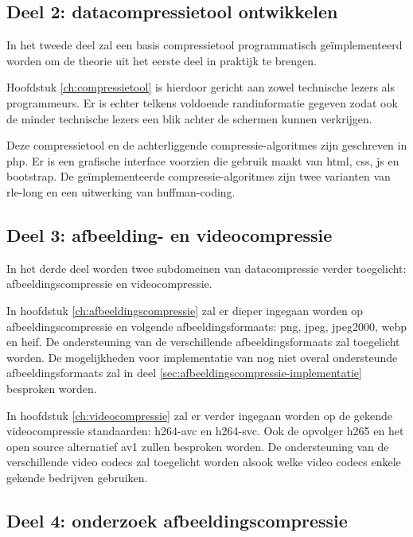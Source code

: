 \subsection{Deel 2: datacompressietool ontwikkelen}
\label{sec:opzet-bachelorproef-deel-2}
 
 In het tweede deel zal een basis \gls{compressietool} programmatisch geïmplementeerd worden om de theorie uit het eerste deel in praktijk te brengen.
 
Hoofdstuk \ref{ch:compressietool} is hierdoor gericht aan zowel technische lezers als programmeurs. Er is echter telkens voldoende randinformatie gegeven zodat ook de minder technische lezers een blik achter de schermen kunnen verkrijgen.

Deze \gls{compressietool} en de achterliggende \glspl{compressie-algoritme} zijn geschreven in \gls{php}. Er is een grafische interface voorzien die gebruik maakt van \gls{html}, \gls{css}, \gls{js} en \gls{bootstrap}. De geïmplementeerde \glspl{compressie-algoritme} zijn twee varianten van \gls{rle-long} en een uitwerking van \gls{huffman-coding}.

\subsection{Deel 3: afbeelding- en videocompressie}
\label{sec:opzet-bachelorproef-deel-3}

In het derde deel worden twee subdomeinen van \gls{datacompressie} verder toegelicht: \gls{afbeeldingscompressie} en \gls{videocompressie}. 

In hoofdstuk \ref{ch:afbeeldingscompressie} zal er dieper ingegaan worden op \gls{afbeeldingscompressie} en volgende \glspl{afbeeldingsformaat}: \gls{png}, \gls{jpeg}, \gls{jpeg2000}, \gls{webp} en \gls{heif}. De ondersteuning van de verschillende \glspl{afbeeldingsformaat} zal toegelicht worden. De mogelijkheden voor implementatie van nog niet overal ondersteunde \glspl{afbeeldingsformaat} zal in deel \ref{sec:afbeeldingscompressie-implementatie} besproken worden.

In hoofdstuk \ref{ch:videocompressie} zal er verder ingegaan worden op de gekende \gls{videocompressie} standaarden: \gls{h264-avc} en \gls{h264-svc}. Ook de opvolger \gls{h265} en het open source alternatief \gls{av1} zullen besproken worden. De ondersteuning van de verschillende video \glspl{codec} zal toegelicht worden alsook welke video \glspl{codec} enkele gekende bedrijven gebruiken.

\subsection{Deel 4: onderzoek afbeeldingscompressie}
\label{sec:opzet-bachelorproef-deel-4}

